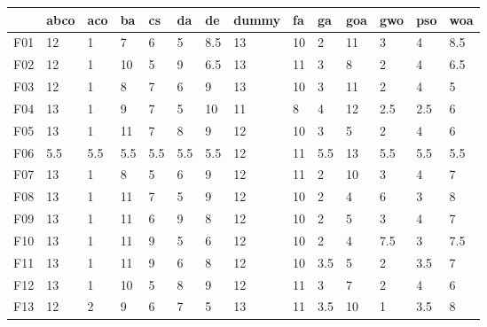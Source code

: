 \begin{table}
    \centering
    \begin{adjustbox}{width=\linewidth}
        \begin{tabular}{llllllllllllll}
            \toprule
            {}   & abco   & aco   & ba    & cs    & da    & de    & dummy  & fa     & ga    & goa   & gwo   & pso   & woa   \\
            \midrule
            F01  & 12     & 1     & 7     & 6     & 5     & 8.5   & 13     & 10     & 2     & 11    & 3     & 4     & 8.5   \\
            F02  & 12     & 1     & 10    & 5     & 9     & 6.5   & 13     & 11     & 3     & 8     & 2     & 4     & 6.5   \\
            F03  & 12     & 1     & 8     & 7     & 6     & 9     & 13     & 10     & 3     & 11    & 2     & 4     & 5     \\
            F04  & 13     & 1     & 9     & 7     & 5     & 10    & 11     & 8      & 4     & 12    & 2.5   & 2.5   & 6     \\
            F05  & 13     & 1     & 11    & 7     & 8     & 9     & 12     & 10     & 3     & 5     & 2     & 4     & 6     \\
            F06  & 5.5    & 5.5   & 5.5   & 5.5   & 5.5   & 5.5   & 12     & 11     & 5.5   & 13    & 5.5   & 5.5   & 5.5   \\
            F07  & 13     & 1     & 8     & 5     & 6     & 9     & 12     & 11     & 2     & 10    & 3     & 4     & 7     \\
            F08  & 13     & 1     & 11    & 7     & 5     & 9     & 12     & 10     & 2     & 4     & 6     & 3     & 8     \\
            F09  & 13     & 1     & 11    & 6     & 9     & 8     & 12     & 10     & 2     & 5     & 3     & 4     & 7     \\
            F10  & 13     & 1     & 11    & 9     & 5     & 6     & 12     & 10     & 2     & 4     & 7.5   & 3     & 7.5   \\
            F11  & 13     & 1     & 11    & 9     & 6     & 8     & 12     & 10     & 3.5   & 5     & 2     & 3.5   & 7     \\
            F12  & 13     & 1     & 10    & 5     & 8     & 9     & 12     & 11     & 3     & 7     & 2     & 4     & 6     \\
            F13  & 12     & 2     & 9     & 6     & 7     & 5     & 13     & 11     & 3.5   & 10    & 1     & 3.5   & 8     \\

\end{tabular}
\end{adjustbox}
\end{table}
